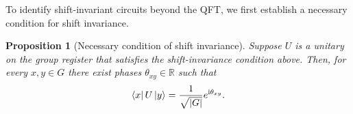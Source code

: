 \documentclass[reprint, aps, prl, superscriptaddress]{revtex4-2}
\newcommand{\ii}{\mathrm{i}}
\newtheorem{definition}{Definition}
\newtheorem{proposition}{Proposition}
\begin{document}



To identify shift-invariant circuits beyond the QFT, we first establish a necessary condition for shift invariance.
\begin{proposition}[Necessary condition of shift invariance]
\label{thm:necessary_modulus_condition}
    Suppose $U$ is a unitary on the group register that satisfies the shift-invariance condition above. Then, for every $x,y\in G$ there exist phases $\theta_{xy}\in\mathbb{R}$ such that
    \begin{equation}
        \bra{x}U\ket{y}=\frac{1}{\sqrt{|G|}}e^{\ii\theta_{xy}}.
    \end{equation}
\end{proposition}

\end{document}
